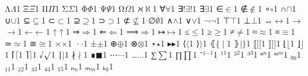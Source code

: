 {    {Λ}{{\ensuremath{\Lambda}}}1
    {Ξ}{{\ensuremath{\Xi}}}1
    {Π}{{\ensuremath{\Pi}}}1
    {Σ}{{\ensuremath{\Sigma}}}1
    {Φ}{{\ensuremath{\Phi}}}1
    {Ψ}{{\ensuremath{\Psi}}}1
    {Ω}{{\ensuremath{\Omega}}}1
    {ℵ}{{\ensuremath{\aleph}}}1
    {∀}{{\ensuremath{\forall}}}1
    {∃!}{{\ensuremath{\exists}!}}1
    {∃}{{\ensuremath{\exists}}}1
    {∈}{{\ensuremath{\in}}}1
    {∉}{{\ensuremath{\notin}}}1
    {∘}{{\ensuremath{\circ}}}1
    {∩}{{\ensuremath{\cap}}}1
    {∪}{{\ensuremath{\cup}}}1
    {⊆}{{\ensuremath{\subseteq}}}1
    {⊂}{{\ensuremath{\subset}}}1
    {⊇}{{\ensuremath{\supseteq}}}1
    {⊃}{{\ensuremath{\supset}}}1
    {⊄}{{\ensuremath{\nsubseteq}}}1
    {∅}{{\ensuremath{\emptyset}}}1
    {∧}{{\ensuremath{\wedge}}}1
    {∨}{{\ensuremath{\vee}}}1
    {¬}{{\ensuremath{\neg}}}1
    {⊤}{{\ensuremath{\top}}}1
    {⊥}{{\ensuremath{\bot}}}1
    {↔}{{\ensuremath{\leftrightarrow}}}1
    {→}{{\ensuremath{\rightarrow}}}1
    {←}{{\ensuremath{\leftarrow}}}1
    {↑}{{\ensuremath{\uparrow}}}1
    {⇒}{{\ensuremath{\Rightarrow}}}1
    {⇐}{{\ensuremath{\Leftarrow}}}1
    {⟹}{{\ensuremath{\Longrightarrow}}}1
    {↦}{{\ensuremath{\mapsto}}}1
    {≤}{{\ensuremath{\leq}}}1
    {≥}{{\ensuremath{\geq}}}1
    {≠}{{\ensuremath{\neq}}}1
    {≈}{{\ensuremath{\approx}}}1
    {≡}{{\ensuremath{\equiv}}}1
    {≃}{{\ensuremath{\simeq}}}1
    {≅}{{\ensuremath{\cong}}}1
    {×}{{\ensuremath{\times}}}1
    {·}{{\ensuremath{\cdot}}}1
    {±}{{\ensuremath{\pm}}}1
    {⊕}{{\ensuremath{\oplus}}}1
    {⊗}{{\ensuremath{\otimes}}}1
    {⋆}{{\ensuremath{\star}}}1
    {▸}{{\ensuremath{\blacktriangleright}}}1
    {⟨}{{\ensuremath{\langle}}}1
    {⟩}{{\ensuremath{\rangle}}}1
    {⦃}{{\ensuremath{\{\!\mid}}}1
    {⦄}{{\ensuremath{\mid\!\}}}}1
    {⟦}{{\ensuremath{[\![}}}1
    {⟧}{{\ensuremath{]\!]}}}1
    {⌊}{{\ensuremath{\lfloor}}}1
    {⌋}{{\ensuremath{\rfloor}}}1
    {⌈}{{\ensuremath{\lceil}}}1
    {⌉}{{\ensuremath{\rceil}}}1
    {√}{{\ensuremath{\surd}}}1
    {∣}{{\ensuremath{\mid}}}1
    {∤}{{\ensuremath{\nmid}}}1
    {∎}{{\ensuremath{\blacksquare}}}1
    {⋯}{{\ensuremath{\cdots}}}1
    {…}{{\ensuremath{\ldots}}}1
    {∑}{{\ensuremath{\sum}}}1
    {∏}{{\ensuremath{\prod}}}1
    {⁻¹}{{\ensuremath{^{-1}}}}1
    {¹}{{\ensuremath{^1}}}1
    {²}{{\ensuremath{^2}}}1
    {³}{{\ensuremath{^3}}}1
    {ⁿ}{{\ensuremath{^n}}}1
    {ᵐ}{{\ensuremath{^m}}}1
    {₀}{{\ensuremath{_0}}}1
    {₁}{{\ensuremath{_1}}}1
    {₂}{{\ensuremath{_2}}}1
    {₃}{{\ensuremath{_3}}}1
    {₄}{{\ensuremath{_4}}}1
    {₅}{{\ensuremath{_5}}}1
    {ₙ}{{\ensuremath{_n}}}1
    {ₘ}{{\ensuremath{_m}}}1
    {ₖ}{{\ensuremath{_k}}}1
}
